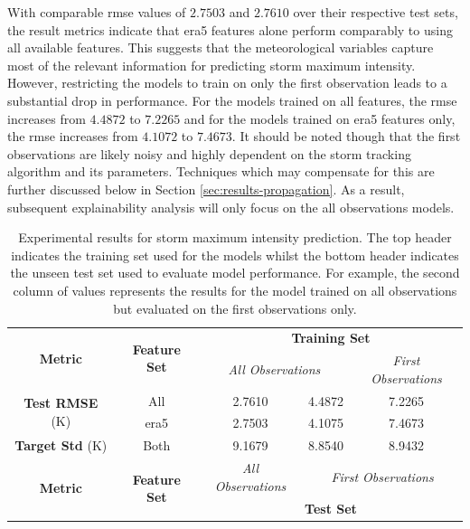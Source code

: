 With comparable \acrshort{rmse} values of $2.7503$ and $2.7610$ over their respective test sets, the result metrics indicate that \acrshort{era5} features alone perform comparably to using all available features. This suggests that the meteorological variables capture most of the relevant information for predicting storm maximum intensity. However, restricting the models to train on only the first observation leads to a substantial drop in performance. For the models trained on all features, the \acrshort{rmse} increases from $4.4872$ to $7.2265$ and for the models trained on \acrshort{era5} features only, the \acrshort{rmse} increases from $4.1072$ to $7.4673$. It should be noted though that the first observations are likely noisy and highly dependent on the storm tracking algorithm and its parameters. Techniques which may compensate for this are further discussed below in Section \ref{sec:results-propagation}. As a result, subsequent explainability analysis will only focus on the all observations models.

\begin{table}[ht]
\centering
\caption{Experimental results for storm maximum intensity prediction. The top header indicates the training set used for the models whilst the bottom header indicates the unseen test set used to evaluate model performance. For example, the second column of values represents the results for the model trained on all observations but evaluated on the first observations only.}
\label{tab:storm_max_intensity_results}
\begin{tabular}{|c|c|c|c|c|}
\hline
\multirow{2}{*}{\textbf{Metric}} & \multirow{2}{*}{\textbf{Feature Set}} & \multicolumn{3}{c|}{\textbf{Training Set} } \\ \cline{3-5}
 & & \multicolumn{2}{c|}{\textit{All Observations}} & \textit{First Observations} \\
\hline \hline
\multirow{2}{*}{\textbf{Test RMSE} (\unit{\kelvin})} & All & 2.7610 & 4.4872 & 7.2265 \\
 & \acrshort{era5} & 2.7503 & 4.1075 & 7.4673 \\
\hline
\textbf{Target Std} (\unit{\kelvin}) & Both & 9.1679 & 8.8540 & 8.9432 \\
\hline \hline
\multirow{2}{*}{\textbf{Metric}} & \multirow{2}{*}{\textbf{Feature Set}} & \textit{All Observations} & \multicolumn{2}{c|}{\textit{First Observations}} \\ \cline{3-5}
 & & \multicolumn{3}{c|}{\textbf{Test Set}} \\ 
\hline
\end{tabular}
\end{table}

